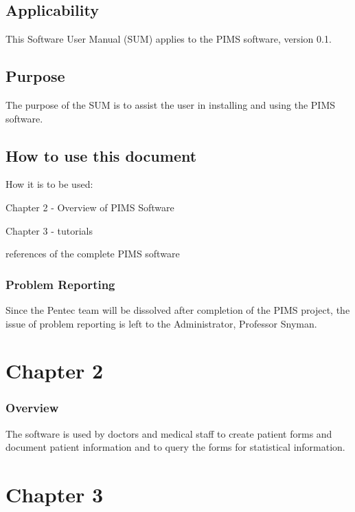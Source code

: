 \documentclass[a4paper]{article}
\begin{document}
\subsection{Applicability}
This Software User Manual (SUM) applies to the PIMS software, version 0.1.\\


\subsection{Purpose}
The purpose of the SUM is to assist the user in installing and using the PIMS software.\\

	
\subsection{How to use this document}
\begin{description}
\item How it is to be used:
\item[$\bullet$]  Chapter 2 - Overview of PIMS Software
\item[$\bullet$] Chapter 3 - tutorials
\item[$\bullet$] references of the complete PIMS software
\end{description}

	
\subsubsection{Problem Reporting}
Since the Pentec team will be dissolved after completion of the PIMS project, the
issue of problem reporting is left to the Administrator, Professor Snyman.\\
	

\section{Chapter 2}
\subsubsection{Overview}
The software is used by doctors and medical staff to create patient forms and document patient information and to query the forms for statistical information. 
\\

\section{Chapter 3}
\end{document}
